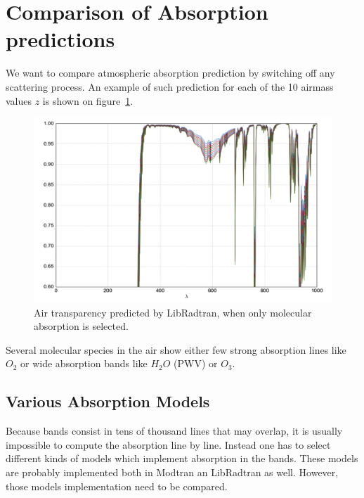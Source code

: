 \documentclass[a4paper]{article}
\begin{document}

\section{Comparison of Absorption predictions}

We want to compare atmospheric absorption prediction by switching off any scattering process.
An example of such prediction for each of the 10 airmass values $z$ is shown on figure~\ref{fig:rt_absorption}.

\begin{figure}
\centering
\includegraphics[width=1\textwidth]{images/rt_absorption.png}
\caption{\label{fig:rt_absorption} Air transparency predicted by LibRadtran, when only molecular absorption is selected.}
\end{figure}
Several molecular species in the air show either few strong absorption lines like $O_2$ or wide absorption bands like $H_2O$ (PWV) or $O_3$.

\subsection{Various Absorption Models}
Because bands consist in tens of thousand lines that may overlap, it is usually impossible to compute the absorption line by line.
Instead one has to select different kinds of models which implement absorption in the bands.
These models are probably implemented both in Modtran an LibRadtran as well. However, those models implementation need to be compared.
\end{document}
